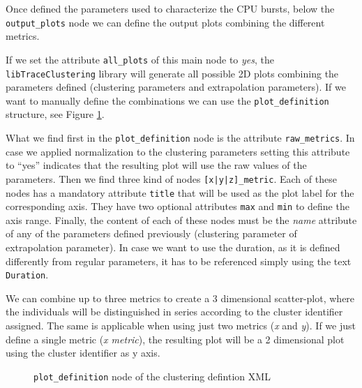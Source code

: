 \documentclass[a4paper, 12pt]{article}
\begin{document}
Once defined the parameters used to characterize the CPU bursts, below
the \texttt{output\_plots} node we can define the output plots combining
the different metrics.

If we set the attribute \texttt{all\_plots} of this main node to \textit{yes},
the \texttt{libTrace\-Clustering} library will generate all possible 2D plots
combining the parameters defined (clustering parameters and extrapolation
parameters). If we want to manually define the combinations we can use 
the \texttt{plot\_definition} structure, see Figure \ref{fig:xml_plot_definition}.

What we find first in the \texttt{plot\_definition} node is the attribute
\texttt{raw\_metrics}. In case we applied normalization to the clustering
parameters setting this attribute to ``yes'' indicates that the resulting
plot will use the raw values of the parameters. Then we find three kind
of nodes \texttt{[x|y|z]\_metric}. Each of these nodes has a mandatory
attribute \texttt{title} that will be used as the plot label for the
corresponding axis. They have two optional attributes \texttt{max} and
\texttt{min} to define the axis range. Finally, the content of each of
these nodes must be the \textit{name} attribute of any of the parameters 
defined previously (clustering parameter of extrapolation parameter). In case
we want to use the duration, as it is defined differently from regular
parameters, it has to be referenced simply using the text \texttt{Duration}.

We can combine up to three metrics to create a 3 dimensional scatter-plot,
where the individuals will be distinguished in series according to the
cluster identifier assigned. The same is applicable when using just two
metrics (\textit{x} and \textit{y}). If we just define a single metric 
(\textit{x metric}), the resulting plot will be a 2 dimensional plot using
the cluster identifier as y axis.

\begin{figure}
  \centering
  \caption{\texttt{plot\_definition} node of the clustering defintion XML}
  \label{fig:xml_plot_definition}
\end{figure}

% 

\end{document}
